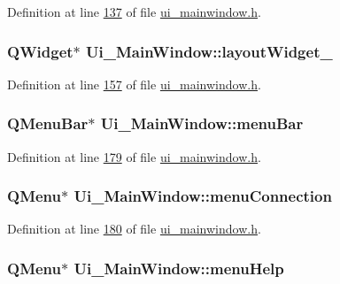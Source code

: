Definition at line \hyperlink{a00052_source_l00137}{137} of file \hyperlink{a00052_source}{ui\+\_\+mainwindow.\+h}.

\hypertarget{a00027_a11b1a1b252036633f800cedbf396286b}{
\subsubsection[{layout\+Widget\+\_\+5}]{\setlength{\rightskip}{0pt plus 5cm}Q\+Widget$\ast$ Ui\+\_\+\+Main\+Window\+::layout\+Widget\+\_}}\label{a00027_a11b1a1b252036633f800cedbf396286b}


Definition at line \hyperlink{a00052_source_l00157}{157} of file \hyperlink{a00052_source}{ui\+\_\+mainwindow.\+h}.

\hypertarget{a00027_a2be1c24ec9adfca18e1dcc951931457f}{
\subsubsection[{menu\+Bar}]{\setlength{\rightskip}{0pt plus 5cm}Q\+Menu\+Bar$\ast$ Ui\+\_\+\+Main\+Window\+::menu\+Bar}}\label{a00027_a2be1c24ec9adfca18e1dcc951931457f}


Definition at line \hyperlink{a00052_source_l00179}{179} of file \hyperlink{a00052_source}{ui\+\_\+mainwindow.\+h}.

\hypertarget{a00027_a08372e1c0820afb98e2cdf98d1738036}{
\subsubsection[{menu\+Connection}]{\setlength{\rightskip}{0pt plus 5cm}Q\+Menu$\ast$ Ui\+\_\+\+Main\+Window\+::menu\+Connection}}\label{a00027_a08372e1c0820afb98e2cdf98d1738036}


Definition at line \hyperlink{a00052_source_l00180}{180} of file \hyperlink{a00052_source}{ui\+\_\+mainwindow.\+h}.

\hypertarget{a00027_ab95dbfbb0550206aeac76db36f491548}{
\subsubsection[{menu\+Help}]{\setlength{\rightskip}{0pt plus 5cm}Q\+Menu$\ast$ Ui\+\_\+\+Main\+Window\+::menu\+Help}}\label{a00027_ab95dbfbb0550206aeac76db36f491548}


